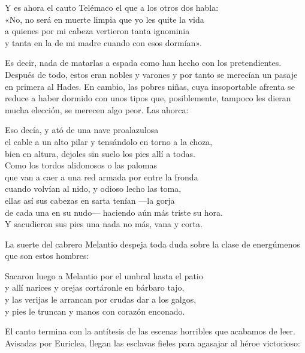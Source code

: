 \begin{versocita}
Y es ahora el cauto Telémaco el que a los otros dos habla:\\
«No, no será en muerte limpia que yo les quite la vida\\
a quienes por mi cabeza vertieron tanta ignominia\\
y tanta en la de mi madre cuando con esos dormían».
\end{versocita}

Es decir, nada de matarlas a espada como han hecho con los pretendientes. Después de todo, estos eran nobles y varones y por tanto se merecían un pasaje en primera al Hades. En cambio, las pobres niñas, cuya insoportable afrenta se reduce a haber dormido con unos tipos que, posiblemente, tampoco les dieran mucha elección, se merecen algo peor. Las ahorca:

\begin{versocita}
Eso decía, y ató de una nave proalazulosa\\
el cable a un alto pilar y tensándolo en torno a la choza,\\
bien en altura, dejoles sin suelo los pies allí a todas.\\
Como los tordos alidonosos o las palomas\\
que van a caer a una red armada por entre la fronda\\
cuando volvían al nido, y odioso lecho las toma,\\
ellas así sus cabezas en sarta tenían ---la gorja\\
de cada una en su nudo--- haciendo aún más triste su hora.\\
Y sacudieron sus pies una nada no más, vana y corta.
\end{versocita}

La suerte del cabrero Melantio despeja toda duda sobre la clase de energúmenos que son estos hombres:

\begin{versocita}
Sacaron luego a Melantio por el umbral hasta el patio\\
y allí narices y orejas cortáronle en bárbaro tajo,\\
y las verijas le arrancan por crudas dar a los galgos,\\
y pies le truncan y manos con corazón enconado.
\end{versocita}

El canto termina con la antítesis de las escenas horribles que acabamos de leer. Avisadas por Euriclea, llegan las esclavas fieles para agasajar al héroe victorioso:

